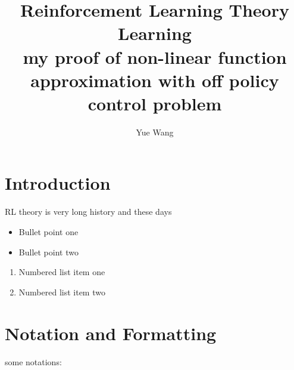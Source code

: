 \documentclass[10pt,a4paper]{article}
\title{Reinforcement Learning Theory Learning \\ \textbf{my proof of non-linear function approximation with off policy control problem}}
\author{Yue Wang}
\theoremstyle{definition}
\theoremstyle{remark}
\begin{document}
	\maketitle
	
	
	\section{Introduction}
	\label{introduction}
	
	RL theory is very long history and these days
	
	\begin{itemize}
		\item Bullet point one
		\item Bullet point two
	\end{itemize}
	
	\begin{enumerate}
		\item Numbered list item one
		\item Numbered list item two
	\end{enumerate}
	
	\section{Notation and Formatting}
	\label{notation}
	some notations: 
	
\end{document}
